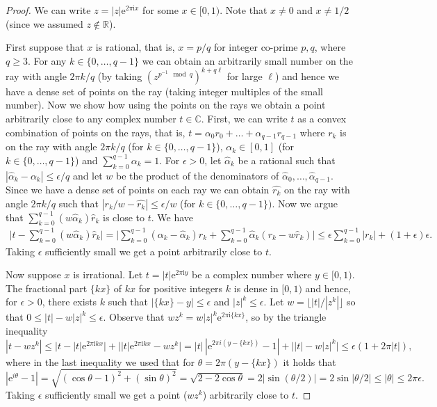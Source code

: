 \documentclass[11pt]{article}
\def\Reals{\mathbb{R}}
\def\Complex{\mathbb{C}}
\newcommand{\im}{\mathrm{i}}
\newcommand{\emm}{\mathrm{e}}
\newcommand{\eps}{\epsilon}
\begin{document}
\begin{proof}
We can write $z = |z| \emm^{2\pi \im x}$ for some $x\in [0,1)$. Note that $x\neq 0$ and $x\neq 1/2$
(since we assumed $z\not\in\Reals$).

First suppose that $x$ is rational, that is, $x=p/q$ for integer co-prime $p,q$, where $q\geq 3$.
For any $k\in\{0,\dots,q-1\}$ we can obtain an arbitrarily small number on the ray with angle $2\pi k/q$
(by taking $(z^{p^{-1}\mod q})^{k+q\ell}$ for large $\ell$)
and hence we have a dense set of points on the ray (taking integer multiples of the small number). Now we show how using the points on the rays we
obtain a point arbitrarily close to any complex number $t\in\Complex$. First, we can write $t$ as a convex combination of
points on the rays, that is, $t=\alpha_0 r_0 + \dots + \alpha_{q-1} r_{q-1}$ where $r_k$ is
on the ray with angle $2\pi k/q$ (for $k\in\{0,\dots,q-1\}$), $\alpha_k\in [0,1]$ (for $k\in\{0,\dots,q-1\}$)
and  $\sum_{k=0}^{q-1}\alpha_k = 1$. For $\epsilon>0$, let $\hat{\alpha}_k$ be a rational such that
$|\hat{\alpha}_k-\alpha_k|\leq\eps/q$ and let $w$ be the product
of the denominators of $\hat{\alpha}_0,\dots,\hat{\alpha}_{q-1}$.
Since we have a dense set of points on each ray we can obtain $\hat{r_k}$ on the ray with angle $2\pi k/q$
such that $|r_k/w - \hat{r_k}|\leq\eps/w$ (for $k\in\{0,\dots,q-1\})$. Now we argue that
$\sum_{k=0}^{q-1} (w\hat{\alpha}_k) \hat{r}_k$ is close to $t$. We have
\begin{equation}
\begin{split}
\bigg|t- \sum_{k=0}^{q-1} (w\hat{\alpha}_k) \hat{r}_k\bigg| =
\bigg|\sum_{k=0}^{q-1} (\alpha_k-\hat{\alpha}_k) r_k + \sum_{k=0}^{q-1} \hat{\alpha}_k (r_k - w\hat{r}_k) \bigg|
\leq \eps\sum_{k=0}^{q-1} |r_k| + (1+\eps)\eps.
\end{split}
\end{equation}
Taking $\eps$ sufficiently small we get a point arbitrarily close to $t$.

Now suppose $x$ is irrational. Let $t=|t|\emm^{2\pi \im y}$ be a complex number where $y\in [0,1)$.
The fractional part $\{kx\}$ of $kx$ for positive integers $k$ is dense in $[0,1)$ and hence, for $\epsilon>0$, there exists
$k$ such that $|\{kx\} - y|\leq\eps$ and $|z|^k\leq\eps$. Let $w=\lfloor |t|/|z^k| \rfloor$ so that $0\leq |t|-w |z|^k\leq \eps$. Observe that $wz^k=w|z|^k\emm^{2\pi \im \{kx\}}$, so by the triangle inequality
\begin{equation*}
|t - w z^k| \leq \big|t - |t|\emm^{2\pi \im kx}\big|+ \big||t|\emm^{2\pi \im kx}-wz^k\big|=|t|\, | \emm^{2\pi i (y-\{kx\})}-1|+ \big|  |t|- w |z|^k\big| \leq \eps ( 1+ 2\pi |t| ),
\end{equation*}
where in the last inequality we used that for $\theta=2\pi(y-\{kx\})$ it holds that \[| \emm^{i \theta}-1|=\sqrt{(\cos \theta-1)^2+(\sin \theta)^2}=\sqrt{2-2\cos \theta}=2|\sin(\theta/2)|= 2\sin|\theta/2|\leq  |\theta|\leq 2\pi\eps.\] Taking $\eps$ sufficiently small we get a point ($w z^k$) arbitrarily close to $t$.
\end{proof}
\end{document}
